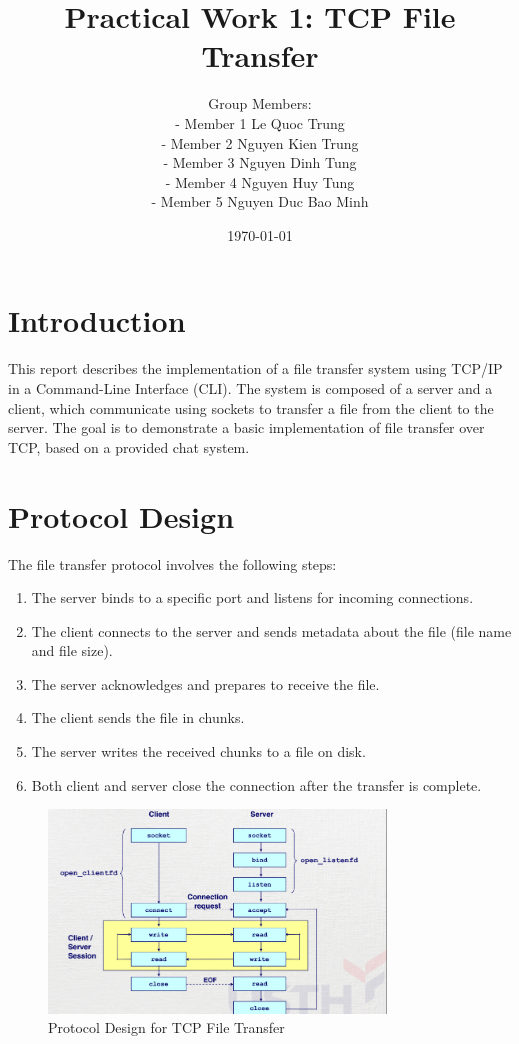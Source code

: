 \documentclass[a4paper, 12pt]{article}
\title{Practical Work 1: TCP File Transfer}
\author{Group Members: \\[0.2cm]
- Member 1 Le Quoc Trung \\ 
- Member 2 Nguyen Kien Trung \\
- Member 3 Nguyen Dinh Tung \\
- Member 4 Nguyen Huy Tung \\
- Member 5 Nguyen Duc Bao Minh \\
}
\date{\today}
\begin{document}
\maketitle

\section{Introduction}
This report describes the implementation of a file transfer system using TCP/IP in a Command-Line Interface (CLI). The system is composed of a server and a client, which communicate using sockets to transfer a file from the client to the server. The goal is to demonstrate a basic implementation of file transfer over TCP, based on a provided chat system.

\section{Protocol Design}
The file transfer protocol involves the following steps:
\begin{enumerate}
    \item The server binds to a specific port and listens for incoming connections.
    \item The client connects to the server and sends metadata about the file (file name and file size).
    \item The server acknowledges and prepares to receive the file.
    \item The client sends the file in chunks.
    \item The server writes the received chunks to a file on disk.
    \item Both client and server close the connection after the transfer is complete.
\end{enumerate}

\begin{figure}[h]
    \centering
    \includegraphics[width=0.8\textwidth]{chill.png}
    \caption{Protocol Design for TCP File Transfer}
    \label{fig:protocol}
\end{figure}
\end{document}

